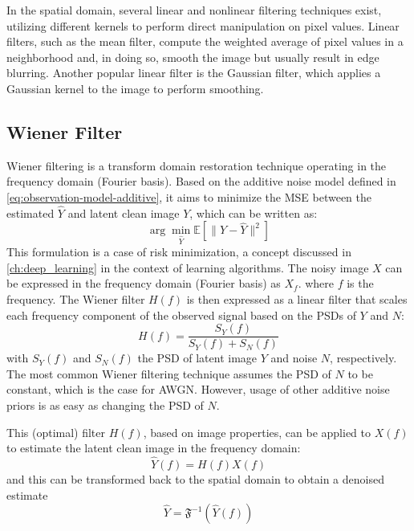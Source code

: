 In the spatial domain, several linear and nonlinear filtering techniques exist, utilizing different kernels to perform direct manipulation on pixel values. Linear filters, such as the mean filter, compute the weighted average of pixel values in a neighborhood and, in doing so, smooth the image but usually result in edge blurring. Another popular linear filter is the Gaussian filter, which applies a Gaussian kernel to the image to perform smoothing.

\subsection{Wiener Filter}
Wiener filtering is a transform domain restoration technique operating in the frequency domain (Fourier basis). Based on the additive noise model defined in \cref{eq:observation-model-additive}, it aims to minimize the \gls{MSE} between the estimated $\hat{Y}$ and latent clean image $Y$, which can be written as:
\begin{equation}\label{eq:wiener-mse}
    \arg \min_{\hat{Y}} \mathbb{E} \left[ \| Y - \hat{Y} \|^2 \right]
\end{equation}
This formulation is a case of risk minimization, a concept discussed in \cref{ch:deep_learning} in the context of learning algorithms. The noisy image $X$ can be expressed in the frequency domain (Fourier basis) as $X_f$.
where $f$ is the frequency. The Wiener filter $H(f)$ is then expressed as a linear filter that scales each frequency component of the observed signal based on the \glspl{PSD} of $Y$ and $N$: 
\begin{equation*}
H(f) = \frac{S_Y(f)}{S_Y(f) + S_N(f)}
\end{equation*}
with $S_Y(f)$ and $S_N(f)$ the \gls{PSD} of latent image $Y$ and noise $N$, respectively. The most common Wiener filtering technique assumes the \gls{PSD} of $N$ to be constant, which is the case for \gls{AWGN}. However, usage of other additive noise priors is as easy as changing the \gls{PSD} of $N$.

This (optimal) filter $H(f)$, based on image properties, can be applied to $X(f)$ to estimate the latent clean image in the frequency domain:
\begin{equation*}
    \hat{Y}(f) = H(f) X(f)
\end{equation*}
and this can be transformed back to the spatial domain to obtain a denoised estimate
\begin{equation*}
    \hat{Y} = \mathfrak{F}^{-1}(\hat{Y}(f))
\end{equation*}


